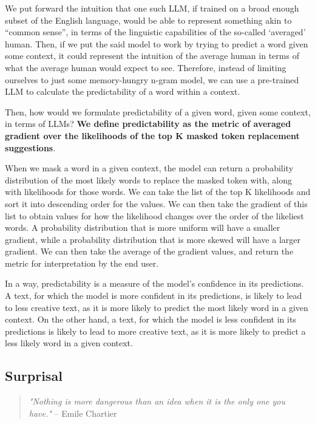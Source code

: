 We put forward the intuition that one such LLM, if trained on a broad enough subset of the English language, would be able to represent something akin to ``common sense'', in terms of the linguistic capabilities of the so-called `averaged' human.
Then, if we put the said model to work by trying to predict a word given some context, it could represent the intuition of the average human in terms of what the average human would expect to see. Therefore, instead of limiting ourselves to just some memory-hungry n-gram model, we can use a pre-trained LLM to calculate the predictability of a word within a context.

Then, how would we formulate predictability of a given word, given some context, in terms of LLMs? \textbf{We define predictability as the metric of averaged gradient over the likelihoods of the top K masked token replacement suggestions}. 

When we mask a word in a given context, the model can return a probability distribution of the most likely words to replace the masked token with, along with likelihoods for those words. We can take the list of the top K likelihoods and sort it into descending order for the values. We can then take the gradient of this list to obtain values for how the likelihood changes over the order of the likeliest words. A probability distribution that is more uniform will have a smaller gradient, while a probability distribution that is more skewed will have a larger gradient. We can then take the average of the gradient values, and return the metric for interpretation by the end user. 

In a way, predictability is a measure of the model's confidence in its predictions. A text, for which the model is more confident in its predictions, is likely to lead to less creative text, as it is more likely to predict the most likely word in a given context. On the other hand, a text, for which the model is less confident in its predictions is likely to lead to more creative text, as it is more likely to predict a less likely word in a given context.

\subsection{Surprisal}\label{surprisal}

\begin{quote}  
\textit{"Nothing is more dangerous than an idea when it is the only one you have."} -- Emile Chartier
\end{quote}

